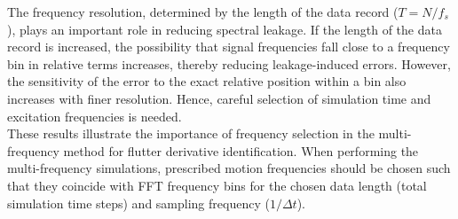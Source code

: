 \documentclass[../main]{subfiles}
\begin{document}
The frequency resolution, determined by the length of the data record (\(T = N/f_s\)), plays an important role in reducing spectral 
leakage. If the length of the data record is increased, the possibility that signal frequencies fall close to a frequency bin in 
relative terms increases, thereby reducing leakage-induced errors. However, the sensitivity of the error to the exact relative 
position within a bin also increases with finer resolution. Hence, careful selection of simulation time and excitation 
frequencies is needed. \\

These results illustrate the importance of frequency selection in the multi-frequency method for flutter derivative identification. 
When performing the multi-frequency simulations, prescribed motion frequencies should be chosen such that they coincide with 
FFT frequency bins for the chosen data length (total simulation time steps) and sampling frequency (\(1/\Delta t\)). \\
\end{document}
